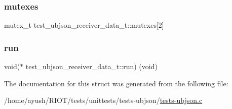 \subsubsection{\texorpdfstring{mutexes}{mutexes}}
{\footnotesize\ttfamily mutex\+\_\+t test\+\_\+ubjson\+\_\+receiver\+\_\+data\+\_\+t\+::mutexes\mbox{[}2\mbox{]}}

\mbox{\label{structtest__ubjson__receiver__data__t_a1a3ef4a864252ac9b0485afcb286e4c7}} 
\subsubsection{\texorpdfstring{run}{run}}
{\footnotesize\ttfamily void($\ast$ test\+\_\+ubjson\+\_\+receiver\+\_\+data\+\_\+t\+::run) (void)}



The documentation for this struct was generated from the following file\+:\begin{DoxyCompactItemize}
\item 
/home/ayush/\+R\+I\+O\+T/tests/unittests/tests-\/ubjson/\hyperlink{tests-ubjson_8c}{tests-\/ubjson.\+c}\end{DoxyCompactItemize}
